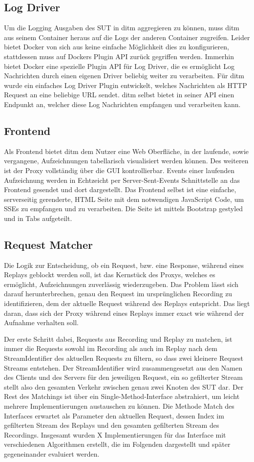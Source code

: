 \documentclass[a4paper]{report}
\begin{document}
\subsection{Log Driver}
Um die Logging Ausgaben des SUT in ditm aggregieren zu können, muss ditm aus seinem Container heraus auf die Logs der
anderen Container zugreifen. Leider bietet Docker von sich aus keine einfache Möglichkeit dies zu konfigurieren,
stattdessen muss auf Dockers Plugin API zurück gegriffen werden. Immerhin bietet Docker eine spezielle Plugin API
für Log Driver, die es ermöglicht Log Nachrichten durch einen eigenen Driver beliebig weiter zu verarbeiten.
Für ditm wurde ein einfaches Log Driver Plugin entwickelt, welches Nachrichten als HTTP Request an eine beliebige URL
sendet. ditm selbst bietet in seiner API einen Endpunkt an, welcher diese Log Nachrichten empfangen und verarbeiten kann.
\subsection{Frontend}
Als Frontend bietet ditm dem Nutzer eine Web Oberfläche, in der laufende, sowie vergangene, Aufzeichnungen
tabellarisch visualisiert werden können. Des weiteren ist der Proxy vollständig über die GUI kontrollierbar.
Events einer laufenden Aufzeichnung werden in Echtzeicht per Server-Sent-Events Schnittstelle an das Frontend
gesendet und dort dargestellt.
Das Frontend selbst ist eine einfache, serverseitig gerenderte, HTML Seite mit dem notwendigen JavaScript Code,
um SSEs zu empfangen und zu verarbeiten. Die Seite ist mittels Bootstrap gestyled und in Tabs aufgeteilt.
\subsection{Request Matcher}
Die Logik zur Entscheidung, ob ein Request, bzw. eine Response, während eines Replays geblockt werden soll,
ist das Kernstück des Proxys, welches es ermöglicht, Aufzeichnungen zuverlässig wiederzugeben.
Das Problem lässt sich darauf herunterbrechen, genau den Request im ursprünglichen Recording zu identifizieren,
dem der aktuelle Request während des Replays entspricht. Das liegt daran, dass sich der Proxy während eines
Replays immer exact wie während der Aufnahme verhalten soll.

Der erste Schritt dabei, Requests aus Recording und Replay zu matchen, ist immer die Requests sowohl im
Recording als auch im Replay nach dem StreamIdentifier des aktuellen Requests zu filtern, so dass zwei
kleinere Request Streams entstehen. Der StreamIdentifier wird zusammengesetzt aus den Namen des Clients
und des Servers für den jeweiligen Request, ein so gefilterter Stream stellt also den gesamten Verkehr
zwischen genau zwei Knoten des SUT dar.
Der Rest des Matchings ist über ein Single-Method-Interface abstrahiert, um leicht mehrere Implementierungen
austauschen zu können. Die Methode Match des Interfaces erwartet als Parameter den aktuellen Request,
dessen Index im gefilterten Stream des Replays und den gesamten gefilterten Stream des Recordings.
Insgesamt wurden X Implementierungen für das Interface mit verschiedenen Algorithmen erstellt, die im Folgenden
dargestellt und später gegeneinander evaluiert werden.
\end{document}
